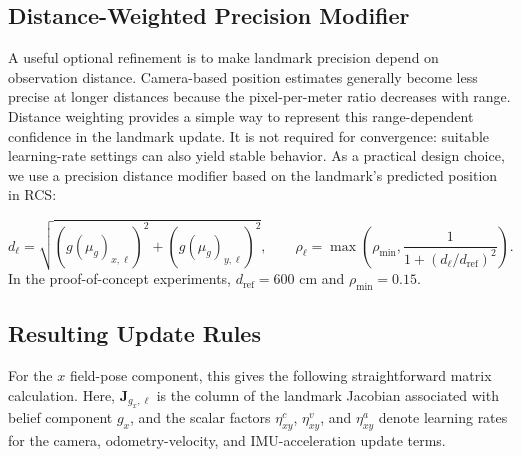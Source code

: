 \subsection{Distance-Weighted Precision Modifier}
\label{subsec:distance-weighted-precision}

A useful optional refinement is to make landmark precision depend on observation distance. Camera-based position estimates generally become less precise at longer distances because the pixel-per-meter ratio decreases with range. Distance weighting provides a simple way to represent this range-dependent confidence in the landmark update. It is not required for convergence: suitable learning-rate settings can also yield stable behavior. As a practical design choice, we use a precision distance modifier based on the landmark's predicted position in RCS:

\begin{equation}
d_\ell =
\sqrt{
    \left(g(\mu_g)_{x,\ell}\right)^2
    +
    \left(g(\mu_g)_{y,\ell}\right)^2
},
    \qquad
    \rho_\ell
    =
    \max
    \left(
        \rho_{\min},
        \frac{1}{1 + \left(d_\ell / d_{\mathrm{ref}}\right)^2}
    \right).
    \label{eq:distance-precision-modifier}
\end{equation}
In the proof-of-concept experiments, $d_{\mathrm{ref}}=600$ cm and $\rho_{\min}=0.15$.

\subsection{Resulting Update Rules}
\label{subsec:update-rules}

For the $x$ field-pose component, this gives the following straightforward
matrix calculation. Here, $\boldsymbol{J}_{g_x,\ell}$ is the column of the landmark Jacobian associated with belief component $g_x$, and the scalar factors $\eta^{c}_{xy}$, $\eta^{v}_{xy}$, and $\eta^{a}_{xy}$ denote learning rates for the camera, odometry-velocity, and IMU-acceleration update terms.

